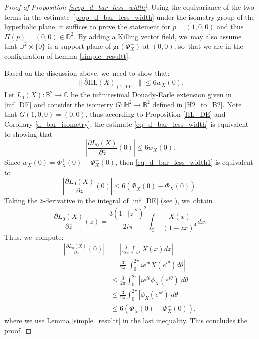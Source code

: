\documentclass[JEP,XML,SOM,Unicode,NoEqCountersInSection, NoFloatCountersInSection,published]{cedram}
\theoremstyle{plain}
\theoremstyle{definition}
\begin{document}
\begin{proof}[Proof of Proposition \ref{prop_d_bar_less_width}]
Using the equivariance of the two terms in the estimate~\eqref{prop_d_bar_less_width} under the isometry group of the hyperbolic plane, it suffices to prove the statement for \(p = (1,0,0) \) and thus \(\Pi(p) = (0,0) \in \mathbb{D}^2\). By adding a Killing vector field, we~may also assume that \(\mathbb{D}^2 \times \{0\}\) is a support plane of \(\mathrm{gr}(\Phi_X^-)\) at \((0,0)\), so~that we are in the configuration of Lemma \ref{simple_resultt}.

Based on the discussion above, we~need to show that:
\begin{equation}\label{eq_d_bar_less_width}
\lVert \overline{\partial} \mathrm{HL}(X)_{(1,0,0)} \rVert \leq 6 w_X(0).
\end{equation}
Let \(L_0(X): \mathbb{B}^2 \to \mathbb{C} \) be the infinitesimal Douady-Earle extension given in \eqref{inf_DE} and consider the isometry \(G:\mathbb{H}^2 \to \mathbb{B}^2 \) defined in \eqref{H2_to_B2}. Note that \(G(1,0,0) = (0,0) \), thus according to Proposition \ref{HL_DE} and Corollary \ref{d_bar_isometry}, the estimate \eqref{eq_d_bar_less_width} is equivalent to showing that
\begin{equation}\label{eq_d_bar_less_width1}
\left| \frac{\partial L_0(X)}{\partial \overline{z}}(0) \right| \leq 6 w_X(0).
\end{equation}
Since \(w_X(0) = \Phi_X^+(0) - \Phi_X^-(0) \), then \eqref{eq_d_bar_less_width1} is equivalent to
\[
\left| \frac{\partial L_0(X)}{\partial \overline{z}}(0) \right| \leq 6(\Phi_X^+(0) - \Phi_X^-(0)).
\]
Taking the \(\overline{z}\)-derivative in the integral of \eqref{inf_DE} (see \cite[p.\,380]{Extension_with_bounded_derivative}), we~obtain
\[
\frac{\partial L_0(X)}{\partial \overline{z}}(z) = \frac{3(1 - \vert z \vert^2)^2}{2i\pi} \int_{\mathbb{S}^1} \frac{X(x)}{(1 - \overline{z}x)^4} dx.
\]
Thus, we~compute:
\begin{align*}
\left| \frac{\partial L_0(X)}{\partial \overline{z}}(0) \right| &= \left| \frac{3}{2i\pi} \int_{\mathbb{S}^1} X(x) dx \right| \\
&= \frac{3}{2\pi} \left| \int_{0}^{2\pi} i e^{i\theta} X(e^{i\theta}) d\theta \right| \\
&\leq \frac{3}{2\pi} \int_{0}^{2\pi} \left| i e^{i\theta} \phi_X(e^{i\theta}) \right| d\theta \\
&\leq \frac{3}{2\pi} \int_{0}^{2\pi} \left| \phi_X(e^{i\theta}) \right| d\theta \\
&\leq 6(\Phi_X^+(0) - \Phi_X^-(0)),
\end{align*}
where we use Lemma \ref{simple_resultt} in the last inequality. This concludes the proof.
\end{proof}
\end{document}
